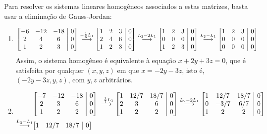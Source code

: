 \documentclass[12pt,a4paper]{article}
\makeatletter
\newenvironment{amatrix}[1]{%
  \left[\begin{array}{@{}*{#1}{c}|c@{}}
}{%
  \end{array}\right]
}
\newcommand{\grstep}[2][\relax]{%
   \ensuremath{\mathrel{
       {\mathop{\longrightarrow}\limits^{#2\mathstrut}_{
                                     \begin{subarray}{l} #1 \end{subarray}}}}}}
\makeatother
\begin{document}
\begin{ExerciseList}
Para resolver os sistemas lineares homogêneos associados a estas matrizes, basta usar a eliminação de Gauss-Jordan:
\begin{enumerate}

\item
\begin{align*}
& \begin{amatrix}{3}
-6&-12&-18& 0\\
 2&  4&  6& 0\\
 1&  2&  3& 0
\end{amatrix}
\grstep{ -\frac{1}{6}L_1 }
\begin{amatrix}{3}
 1&  2&  3& 0\\
 2&  4&  6& 0\\
 1&  2&  3& 0
\end{amatrix}
\grstep{ L_2 - 2 L_1 }
\begin{amatrix}{3}
 1&  2&  3& 0\\
 0&  0&  0& 0\\
 1&  2&  3& 0
\end{amatrix}
\grstep{ L_3 - L_1 }
\begin{amatrix}{3}
 1&  2&  3& 0\\
 0&  0&  0& 0\\
 0&  0&  0& 0
\end{amatrix}
\end{align*}
Assim, o sistema homogêneo é equivalente à equação $x + 2y + 3z = 0$, que é satisfeita por qualquer $(x,y,z)$ em que $x = -2y - 3z$, isto é, $(-2y - 3z, y, z)$, com $y,z$ arbitrários.
\item
\begin{align*}
& \begin{amatrix}{3}
-7&-12&-18& 0\\
 2&  3&  6& 0\\
 1&  2&  2& 0
\end{amatrix}
\grstep{ -\frac{1}{7}L_1 }
\begin{amatrix}{3}
 1&12/7&18/7& 0\\
 2&  3&  6& 0\\
 1&  2&  2& 0
\end{amatrix}
\grstep{ L_2 - 2 L_1 }
\begin{amatrix}{3}
 1&12/7&18/7& 0\\
 0& -3/7 & 6/7 & 0\\
 1&  2&  2& 0
\end{amatrix}\\
\grstep{ L_3 - L_1 }
&
\begin{amatrix}{3}
 1&12/7&18/7& 0\\

\end{amatrix}
\end{align*}
\end{enumerate}
\end{ExerciseList}
\end{document}
